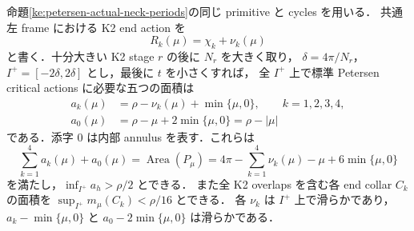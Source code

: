 \begin{lemma}
\label{ke:petersen-target-areas}
命題\ref{ke:petersen-actual-neck-periods}の同じ primitive と cycles を用いる．
共通左 frame における K2 end action を
\[
 R_k(\mu)=\chi_k+\nu_k(\mu)
\]
と書く．十分大きい K2 stage $r$ の後に $N_r$ を大きく取り，
$\delta=4\pi/N_r$，$I^+=[-2\delta,2\delta]$ とし，最後に $t$ を小さくすれば，
全 $I^+$ 上で標準 Petersen critical actions に必要な五つの面積は
\begin{equation}\label{ke:eq:petersen-target-areas}
 \begin{split}
 a_k(\mu)&=\rho-\nu_k(\mu)+\min\{\mu,0\},
                  \qquad k=1,2,3,4,\\
 a_0(\mu)&=\rho-\mu+2\min\{\mu,0\}
            =\rho-|\mu|
 \end{split}
\end{equation}
である．添字 $0$ は内部 annulus を表す．これらは
\begin{equation}\label{ke:eq:petersen-total-area}
 \sum_{k=1}^4a_k(\mu)+a_0(\mu)
 =\operatorname{Area}(P_\mu)
 =4\pi-\sum_{k=1}^4\nu_k(\mu)-\mu+6\min\{\mu,0\}
\end{equation}
を満たし，$\inf_{I^+}a_h>\rho/2$ とできる．
また全 K2 overlaps を含む各 end collar $C_k$ の面積を
$\sup_{I^+}m_\mu(C_k)<\rho/16$ とできる．
各 $\nu_k$ は $I^+$ 上で滑らかであり，
$a_k-\min\{\mu,0\}$ と $a_0-2\min\{\mu,0\}$ は滑らかである．
\end{lemma}

